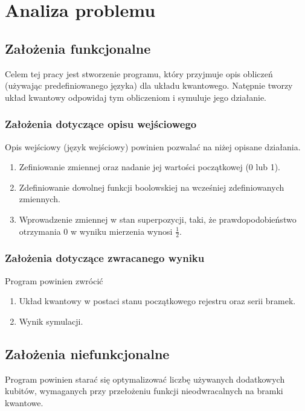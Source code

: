 \chapter{Analiza problemu}
\thispagestyle{chapterBeginStyle}
\label{rozdzial1}
\section{Założenia funkcjonalne}
Celem tej pracy jest stworzenie programu, który przyjmuje opis obliczeń (używając predefiniowanego języka) dla układu kwantowego. Natępnie tworzy układ kwantowy odpowidaj tym obliczeniom i symuluje jego działanie.
\subsection{Założenia dotyczące opisu wejściowego}
Opis wejściowy (język wejściowy) powinien pozwalać na niżej opisane działania.
\begin{enumerate}
    \item Zefiniowanie zmiennej oraz nadanie jej wartości początkowej (0 lub 1).
    \item Zdefiniowanie dowolnej funkcji boolowskiej na wcześniej zdefiniowanych zmiennych.
    \item Wprowadzenie zmiennej w stan superpozycji, taki, że prawdopodobieństwo otrzymania 0 w wyniku mierzenia wynosi $\frac{1}{2}$.
\end{enumerate}
\subsection{Założenia dotyczące zwracanego wyniku}
Program powinien zwrócić
\begin{enumerate}
    \item Układ kwantowy w postaci stanu początkowego rejestru oraz serii bramek.
    \item Wynik symulacji.
\end{enumerate}
\section{Założenia niefunkcjonalne}
Program powinien starać się optymalizować liczbę używanych dodatkowych kubitów, wymaganych przy przełożeniu funkcji nieodwracalnych na bramki kwantowe.
